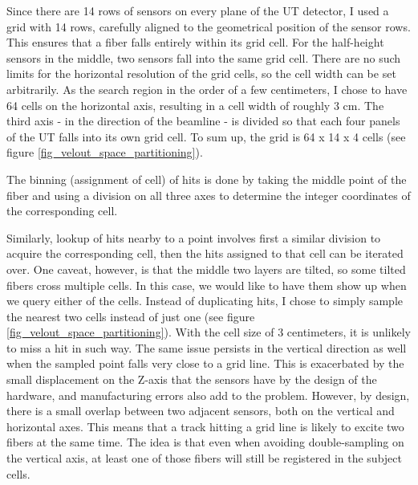 \documentclass[12pt]{article}
\begin{document}
Since there are 14  rows of sensors on every plane of the UT detector, I used a grid with 14 rows, carefully aligned to the geometrical position of the sensor rows. This ensures that a fiber falls entirely within its grid cell. For the half-height sensors in the middle, two sensors fall into the same grid cell. There are no such limits for the horizontal resolution of the grid cells, so the cell width can be set arbitrarily. As the search region in the order of a few centimeters, I chose to have 64 cells on the horizontal axis, resulting in a cell width of roughly 3 cm. The third axis - in the direction of the beamline - is divided so that each four panels of the UT falls into its own grid cell. To sum up, the grid is 64 x 14 x 4 cells (see figure \ref{fig_velout_space_partitioning}).

The binning (assignment of cell) of hits is done by taking the middle point of the fiber and using a division on all three axes to determine the integer coordinates of the corresponding cell.

Similarly, lookup of hits nearby to a point involves first a similar division to acquire the corresponding cell, then the hits assigned to that cell can be iterated over. One caveat, however, is that the middle two layers are tilted, so some tilted fibers cross multiple cells. In this case, we would like to have them show up when we query either of the cells. Instead of duplicating hits, I chose to simply sample the nearest two cells instead of just one (see figure \ref{fig_velout_space_partitioning}). With the cell size of 3 centimeters, it is unlikely to miss a hit in such way. The same issue persists in the vertical direction as well when the sampled point falls very close to a grid line. This is exacerbated by the small displacement on the Z-axis that the sensors have by the design of the hardware, and manufacturing errors also add to the problem. However, by design, there is a small overlap between two adjacent sensors, both on the vertical and horizontal axes. This means that a track hitting a grid line is likely to excite two fibers at the same time. The idea is that even when avoiding double-sampling on the vertical axis, at least one of those fibers will still be registered in the subject cells.
\end{document}
